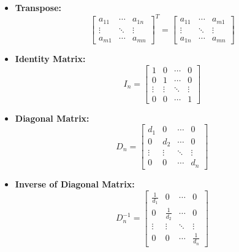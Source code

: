 \documentclass{article}
\begin{document}
\begin{itemize}
    \item \textbf{Transpose:}
    \begin{equation}
        \left[
            \begin{array}{ccc}
                a_{11} & \cdots & a_{1n} \\
                \vdots & \ddots & \vdots \\
                a_{m1} & \cdots & a_{mn}
            \end{array}
        \right]^T
        =
        \left[
            \begin{array}{ccc}
                a_{11} & \cdots & a_{m1} \\
                \vdots & \ddots & \vdots \\
                a_{1n} & \cdots & a_{mn}
            \end{array}
        \right]
        \label{eq:trans}
    \end{equation}

    \item \textbf{Identity Matrix:}
    \begin{equation}
        I_n =
        \left[
            \begin{array}{cccc}
                1 & 0 & \cdots & 0 \\
                0 & 1 & \cdots & 0 \\
                \vdots & \vdots & \ddots & \vdots \\
                0 & 0 & \cdots & 1
            \end{array}
        \right]
        \label{eq:iden}
    \end{equation}

    \item \textbf{Diagonal Matrix:}
    \begin{equation}
        D_n =
        \left[
            \begin{array}{cccc}
                d_1 & 0 & \cdots & 0 \\
                0 & d_2 & \cdots & 0 \\
                \vdots & \vdots & \ddots & \vdots \\
                0 & 0 & \cdots & d_n
            \end{array}
        \right]
        \label{eq:diagm}
    \end{equation}

    \item \textbf{Inverse of Diagonal Matrix:}
    \begin{equation}
        D_n^{-1} =
        \left[
            \begin{array}{cccc}
                \frac{1}{d_1} & 0 & \cdots & 0 \\
                0 & \frac{1}{d_2} & \cdots & 0 \\
                \vdots & \vdots & \ddots & \vdots \\
                0 & 0 & \cdots & \frac{1}{d_n}
            \end{array}
        \right]
        \label{eq:diagminv}
    \end{equation}

\end{itemize}
\end{document}
